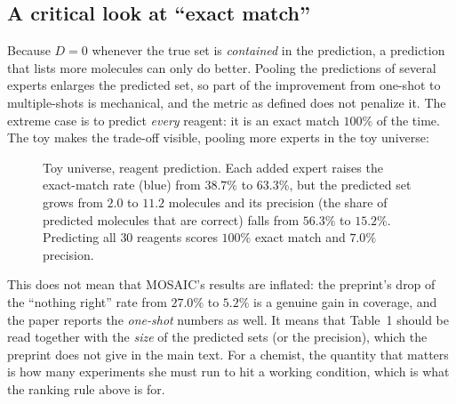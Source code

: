 \documentclass[11pt]{article}
\begin{document}
\subsection*{A critical look at ``exact match''}
Because $D=0$ whenever the true set is \emph{contained} in the prediction, a prediction that lists more molecules can only do better. Pooling the predictions of several experts enlarges the predicted set, so part of the improvement from one-shot to multiple-shots is mechanical, and the metric as defined does not penalize it. The extreme case is to predict \emph{every} reagent: it is an exact match $100\%$ of the time. The toy makes the trade-off visible, pooling more experts in the toy universe:

\begin{figure}[ht]
\centering
{}
\caption{Toy universe, reagent prediction. Each added expert raises the exact-match rate (blue) from $38.7\%$ to $63.3\%$, but the predicted set grows from $2.0$ to $11.2$ molecules and its precision (the share of predicted molecules that are correct) falls from $56.3\%$ to $15.2\%$. Predicting all $30$ reagents scores $100\%$ exact match and $7.0\%$ precision.}
\label{fig:prec}
\end{figure}

This does not mean that MOSAIC's results are inflated: the preprint's drop of the ``nothing right'' rate from $27.0\%$ to $5.2\%$ is a genuine gain in coverage, and the paper reports the \emph{one-shot} numbers as well. It means that Table~1 should be read together with the \emph{size} of the predicted sets (or the precision), which the preprint does not give in the main text. For a chemist, the quantity that matters is how many experiments she must run to hit a working condition, which is what the ranking rule above is for.
\end{document}
